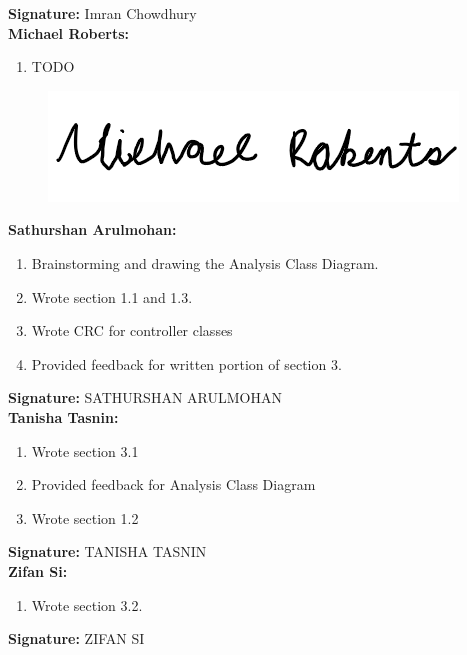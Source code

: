 \documentclass[]{article}
\begin{document}
\textbf{Signature:} Imran Chowdhury \\

\textbf{Michael Roberts:}
\begin{enumerate}
	\item TODO
\end{enumerate}

\begin{figure}[H]
 	\centering
    \includegraphics[width=\textwidth]{image/A_Michael_Roberts_Signature.png}
\end{figure}

\textbf{Sathurshan Arulmohan:}
\begin{enumerate}
	\item Brainstorming and drawing the Analysis Class Diagram.
	\item Wrote section 1.1 and 1.3.
	\item Wrote CRC for controller classes
	\item Provided feedback for written portion of section 3.
\end{enumerate}

\textbf{Signature:} SATHURSHAN ARULMOHAN \\

\textbf{Tanisha Tasnin:}
\begin{enumerate}
	\item Wrote section 3.1 
	\item Provided feedback for Analysis Class Diagram
	\item Wrote section 1.2
\end{enumerate}

\textbf{Signature:} TANISHA TASNIN \\

\textbf{Zifan Si:}
\begin{enumerate}
	\item Wrote section 3.2.
\end{enumerate}

\textbf{Signature:} ZIFAN SI  \\
\end{document}
